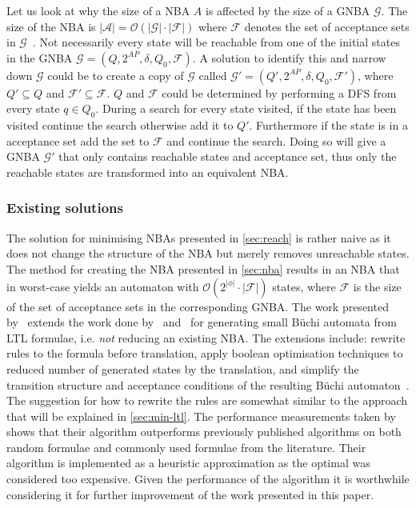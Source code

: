Let us look at why the size of a NBA $A$ is affected by the size of a GNBA $\mathcal{G}$. The size of the NBA is $|\mathcal{A}| = \mathcal{O}(|\mathcal{G}| \cdot |\mathcal{F}|)$ where $\mathcal{F}$ denotes the set of acceptance sets in $\mathcal{G}$~\cite[thm. 4.56]{baier2008principles}. 
Not necessarily every state will be reachable from one of the initial states in the GNBA $\mathcal{G}=(Q,2^{AP},\delta,Q_0,\mathcal{F})$. A solution to identify this and narrow down $\mathcal{G}$ could be to create a copy of $\mathcal{G}$ called $\mathcal{G}'=(Q',2^{AP},\delta,Q_0,\mathcal{F}')$, where $Q' \subseteq Q$ and $\mathcal{F}' \subseteq \mathcal{F}$. $Q$ and $\mathcal{F}$ could be determined by performing a DFS from every state $q \in Q_0$. During a search for every state visited, if the state has been visited continue the search otherwise add it to $Q'$. Furthermore if the state is in a acceptance set add the set to $\mathcal{F}$ and continue the search. Doing so will give a GNBA $\mathcal{G}'$ that only contains reachable states and acceptance set, thus only the reachable states are transformed into an equivalent NBA.

\subsubsection{Existing solutions}
The solution for minimising NBAs presented in \autoref{sec:reach} is rather naive as it does not change the structure of the NBA but merely removes unreachable states. The method for creating the NBA presented in \autoref{sec:nba} results in an NBA that in worst-case yields an automaton with $\mathcal{O}(2^{|\phi|} \cdot |\mathcal{F}|)$ states, where $\mathcal{F}$ is the size of the set of acceptance sets in the corresponding GNBA. The work presented by~\cite{somenzi2000efficient} extends the work done by~\cite{gerth1995simple} and~\cite{daniele1999improved} for generating small Büchi automata from LTL formulae, i.e. \emph{not} reducing an existing NBA. The extensions include: rewrite rules to the formula before translation, apply boolean optimisation techniques to reduced number of generated states by the translation, and simplify the transition structure and acceptance conditions of the resulting Büchi automaton~\cite{somenzi2000efficient}. The suggestion for how to rewrite the rules are somewhat similar to the approach that will be explained in \autoref{sec:min-ltl}. The performance measurements taken by~\cite{somenzi2000efficient} shows that their algorithm outperforms previously published algorithms on both random formulae and commonly used formulae from the literature. Their algorithm is implemented as a heuristic approximation as the optimal was considered too expensive. Given the performance of the algorithm it is worthwhile considering it for further improvement of the work presented in this paper.


